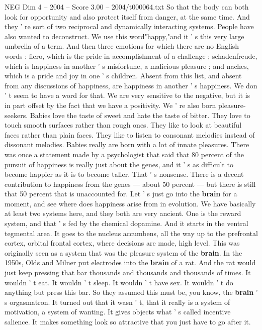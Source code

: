 \begin{textsample}{NEG Dim 4 – 2004 – Score 3.00 – 2004/t000064.txt}
So that the body can both look for opportunity and also protect itself from danger, at the same time.
And they ' re sort of two reciprocal and dynamically interacting systems.
People have also wanted to deconstruct.
We use this word"happy,"and it ' s this very large umbrella of a term.
And then three emotions for which there are no English words : fiero, which is the pride in accomplishment of a challenge ; schadenfreude, which is happiness in another ' s misfortune, a malicious pleasure ; and naches, which is a pride and joy in one ' s children.
Absent from this list, and absent from any discussions of happiness, are happiness in another ' s happiness.
We don ' t seem to have a word for that.
We are very sensitive to the negative, but it is in part offset by the fact that we have a positivity.
We ' re also born pleasure-seekers.
Babies love the taste of sweet and hate the taste of bitter.
They love to touch smooth surfaces rather than rough ones.
They like to look at beautiful faces rather than plain faces.
They like to listen to consonant melodies instead of dissonant melodies.
Babies really are born with a lot of innate pleasures.
There was once a statement made by a psychologist that said that 80 percent of the pursuit of happiness is really just about the genes, and it ' s as difficult to become happier as it is to become taller.
That ' s nonsense.
There is a decent contribution to happiness from the genes — about 50 percent — but there is still that 50 percent that is unaccounted for.
Let ' s just go into the \textbf{brain} for a moment, and see where does happiness arise from in evolution.
We have basically at least two systems here, and they both are very ancient.
One is the reward system, and that ' s fed by the chemical dopamine.
And it starts in the ventral tegmental area.
It goes to the nucleus accumbens, all the way up to the prefrontal cortex, orbital frontal cortex, where decisions are made, high level.
This was originally seen as a system that was the pleasure system of the \textbf{brain}.
In the 1950s, Olds and Milner put electrodes into the \textbf{brain} of a rat.
And the rat would just keep pressing that bar thousands and thousands and thousands of times.
It wouldn ' t eat.
It wouldn ' t sleep.
It wouldn ' t have sex.
It wouldn ' t do anything but press this bar.
So they assumed this must be, you know, the \textbf{brain} ' s orgasmatron.
It turned out that it wasn ' t, that it really is a system of motivation, a system of wanting.
It gives objects what ' s called incentive salience.
It makes something look so attractive that you just have to go after it.

\end{textsample}
